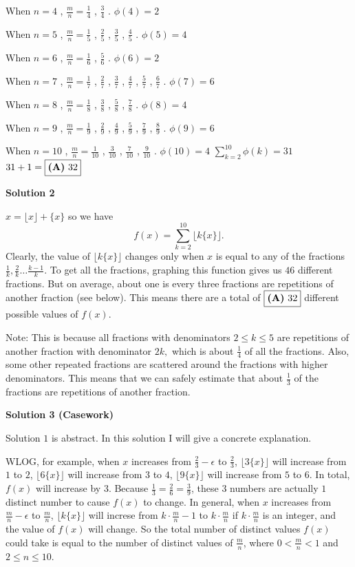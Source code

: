 \begin{enumerate}
 When $n=4$ , $\frac{m}{n}=\frac{1}{4}$ , $\frac{3}{4}$ . $\phi(4)=2$

 When $n=5$ , $\frac{m}{n}=\frac{1}{5}$ , $\frac{2}{5}$ , $\frac{3}{5}$ , $\frac{4}{5}$ . $\phi(5)=4$

 When $n=6$ , $\frac{m}{n}=\frac{1}{6}$ , $\frac{5}{6}$ . $\phi(6)=2$

 When $n=7$ , $\frac{m}{n}=\frac{1}{7}$ , $\frac{2}{7}$ , $\frac{3}{7}$ , $\frac{4}{7}$ , $\frac{5}{7}$ , $\frac{6}{7}$ . $\phi(7)=6$

 When $n=8$ , $\frac{m}{n}=\frac{1}{8}$ , $\frac{3}{8}$ , $\frac{5}{8}$ , $\frac{7}{8}$ . $\phi(8)=4$

 When $n=9$ , $\frac{m}{n}=\frac{1}{9}$ , $\frac{2}{9}$ , $\frac{4}{9}$ , $\frac{5}{9}$ , $\frac{7}{9}$ , $\frac{8}{9}$ . $\phi(9)=6$

 When $n=10$ , $\frac{m}{n}=\frac{1}{10}$ , $\frac{3}{10}$ , $\frac{7}{10}$ , $\frac{9}{10}$ . $\phi(10)=4$
$\sum_{k=2}^{10} \phi(k)=31$
$31+1=\fbox{\textbf{(A)}\ 32}$




\textbf{Solution 2}

$x = \lfloor x \rfloor + \{ x \}$ so we have 
 \[f(x) = \sum_{k=2}^{10} \lfloor k \{ x \} \rfloor.\] Clearly, the value of $\lfloor k \{ x \} \rfloor$ changes only when $x$ is equal to any of the fractions $\frac{1}{k}, \frac{2}{k} \dots \frac{k-1}{k}$. To get all the fractions, graphing this function gives us $46$ different fractions. But on average, about one is every three fractions are repetitions of another fraction (see below). This means there are a total of $\fbox{\textbf{(A)}\ 32}$ different possible values of $f(x)$.

 Note: This is because all fractions with denominators $2\le k \le 5$ are repetitions of another fraction with denominator $2k,$ which is about $\frac{1}{4}$ of all the fractions. Also, some other repeated fractions are scattered around the fractions with higher denominators. This means that we can safely estimate that about $\frac{1}{3}$ of the fractions are repetitions of another fraction.

 



\textbf{Solution 3 (Casework)}

Solution $1$ is abstract. In this solution I will give a concrete explanation.

 WLOG, for example, when $x$ increases from $\frac{2}{3}-\epsilon$ to $\frac{2}{3}$, $\lfloor 3 \{ x \} \rfloor$ will increase from $1$ to $2$, $\lfloor 6 \{ x \} \rfloor$ will increase from $3$ to $4$, $\lfloor 9 \{ x \} \rfloor$ will increase from $5$ to $6$. In total, $f(x)$ will increase by $3$. Because $\frac{1}{3}=\frac{2}{6}=\frac{3}{9}$, these $3$ numbers are actually $1$ distinct number to cause $f(x)$ to change. In general, when $x$ increases from $\frac{m}{n}-\epsilon$ to $\frac{m}{n}$, $\lfloor k \{ x \} \rfloor$ will increse from $k \cdot \frac{m}{n} -1$ to $k \cdot \frac{m}{n}$ if $k \cdot \frac{m}{n}$ is an integer, and the value of $f(x)$ will change. So the total number of distinct values $f(x)$ could take is equal to the number of distinct values of $\frac{m}{n}$, where $0 < \frac{m}{n}<1$ and $2 \le n \le 10$. 


\end{enumerate}
